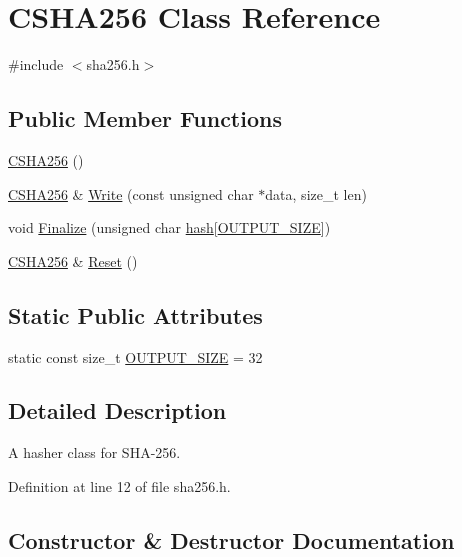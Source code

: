 \hypertarget{class_c_s_h_a256}{}\section{C\+S\+H\+A256 Class Reference}
\label{class_c_s_h_a256}


{\ttfamily \#include $<$sha256.\+h$>$}

\subsection*{Public Member Functions}
\begin{DoxyCompactItemize}
\item 
\hyperlink{class_c_s_h_a256_af85504e7cde3b2f33614d59f6d3ff561}{C\+S\+H\+A256} ()
\item 
\hyperlink{class_c_s_h_a256}{C\+S\+H\+A256} \& \hyperlink{class_c_s_h_a256_a9d7de520a562655da85349372820c883}{Write} (const unsigned char $\ast$data, size\+\_\+t len)
\item 
void \hyperlink{class_c_s_h_a256_a4259230be0caefa590bc324fc12b9b90}{Finalize} (unsigned char \hyperlink{cache_8cc_a11ecb029164e055f28f4123ce3748862}{hash}\mbox{[}\hyperlink{class_c_s_h_a256_a3d7ef512c0ceb0008396e62f5c4771fc}{O\+U\+T\+P\+U\+T\+\_\+\+S\+I\+Z\+E}\mbox{]})
\item 
\hyperlink{class_c_s_h_a256}{C\+S\+H\+A256} \& \hyperlink{class_c_s_h_a256_a2122395dd5604990eaa0077b43a0e8d4}{Reset} ()
\end{DoxyCompactItemize}
\subsection*{Static Public Attributes}
\begin{DoxyCompactItemize}
\item 
static const size\+\_\+t \hyperlink{class_c_s_h_a256_a3d7ef512c0ceb0008396e62f5c4771fc}{O\+U\+T\+P\+U\+T\+\_\+\+S\+I\+Z\+E} = 32
\end{DoxyCompactItemize}


\subsection{Detailed Description}
A hasher class for S\+H\+A-\/256. 

Definition at line 12 of file sha256.\+h.



\subsection{Constructor \& Destructor Documentation}
\hypertarget{class_c_s_h_a256_af85504e7cde3b2f33614d59f6d3ff561}{}
